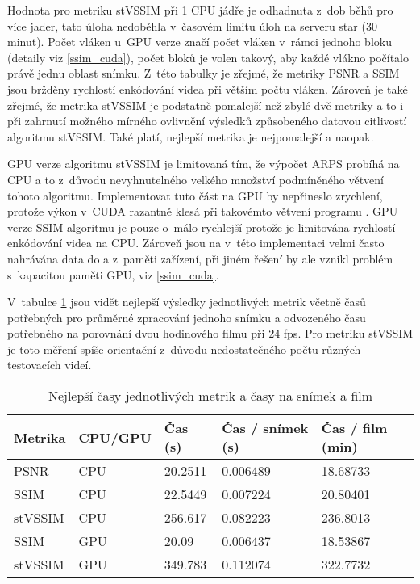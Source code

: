\documentclass[thesis=M,czech]{FITthesis}[2016/06/26]
\begin{document}
 
Hodnota pro metriku stVSSIM při 1 CPU jádře je odhadnuta z~dob běhů pro více jader, tato úloha nedoběhla v~časovém limitu úloh na serveru star (30 minut). Počet vláken u~GPU verze značí počet vláken v~rámci jednoho bloku (detaily viz \autoref{ssim_cuda}), počet bloků je volen takový, aby každé vlákno počítalo právě jednu oblast snímku. Z~této tabulky je zřejmé, že metriky PSNR a SSIM jsou bržděny rychlostí enkódování videa při větším počtu vláken. Zároveň je také zřejmé, že metrika stVSSIM je podstatně pomalejší než zbylé dvě metriky a to i při zahrnutí možného mírného ovlivnění výsledků způsobeného datovou citlivostí algoritmu stVSSIM. Také platí, nejlepší metrika je nejpomalejší a naopak.

GPU verze algoritmu stVSSIM je limitovaná tím, že výpočet ARPS probíhá na CPU a to z~důvodu nevyhnutelného velkého množství podmíněného větvení tohoto algoritmu. Implementovat tuto část na GPU by nepřineslo zrychlení, protože výkon v~CUDA razantně klesá při takovémto větvení programu \cite{warp}. GPU verze SSIM algoritmu je pouze o~málo rychlejší protože je limitována rychlostí enkódování videa na CPU. Zároveň jsou na v~této implementaci velmi často nahrávána data do a z~paměti zařízení, při jiném řešení by ale vznikl problém s~kapacitou paměti GPU, viz \autoref{ssim_cuda}.

V~tabulce \ref{tab:compare_metrics_best} jsou vidět nejlepší výsledky jednotlivých metrik včetně časů potřebných pro průměrné zpracování jednoho snímku a odvozeného času potřebného na porovnání dvou hodinového filmu při 24 fps. Pro metriku stVSSIM je toto měření spíše orientační z~důvodu nedostatečného počtu různých testovacích videí.

\begin{table}[]
\centering
\begin{tabular}{|l|l|l|l|l|}
\hline
Metrika & CPU/GPU & Čas (s) & Čas / snímek (s) & Čas / film (min) \\ \hline
PSNR    & CPU     & 20.2511 & 0.006489         & 18.68733         \\ \hline
SSIM    & CPU     & 22.5449 & 0.007224         & 20.80401         \\ \hline
stVSSIM & CPU     & 256.617 & 0.082223         & 236.8013         \\ \hline
SSIM    & GPU     & 20.09   & 0.006437         & 18.53867         \\ \hline
stVSSIM & GPU     & 349.783 & 0.112074         & 322.7732         \\ \hline


\end{tabular}
\caption{Nejlepší časy jednotlivých metrik a časy na snímek a film} \label{tab:compare_metrics_best}
\end{table}
\end{document}
